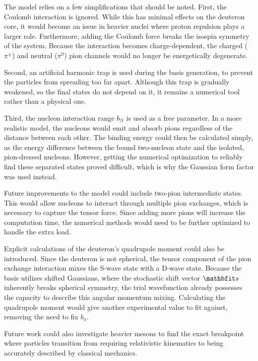 \documentclass[a4paper,oneside,article,12pt]{memoir}
\begin{document}
The model relies on a few simplifications that should be noted. First, the Coulomb interaction is ignored. While this has minimal effects on the deuteron core, it would become an issue in heavier nuclei where proton repulsion plays a larger role. Furthermore, adding the Coulomb force breaks the isospin symmetry of the system. Because the interaction becomes charge-dependent, the charged ($\pi^\pm$) and neutral ($\pi^0$) pion channels would no longer be energetically degenerate. 

\newpage
Second, an artificial harmonic trap is used during the basis generation, to prevent the particles from spreading too far apart. Although this trap is gradually weakened, so the final states do not depend on it, it remains a numerical tool rather than a physical one.

Third, the nucleon interaction range $b_N$ is used as a free parameter. In a more realistic model, the nucleons would emit and absorb pions regardless of the distance between each other. The binding energy could then be calculated simply, as the energy difference between the bound two-nucleon state and the isolated, pion-dressed nucleons. However, getting the numerical optimization to reliably find these separated states proved difficult, which is why the Gaussian form factor was used instead.

Future improvements to the model could include two-pion intermediate states. This would allow nucleons to interact through multiple pion exchanges, which is necessary to capture the tensor force. Since adding more pions will increase the computation time, the numerical methods would need to be further optimized to handle the extra load.

Explicit calculations of the deuteron's quadrupole moment could also be introduced. Since the deuteron is not spherical, the tensor component of the pion exchange interaction mixes the S-wave state with a D-wave state. Because the basis utilizes shifted Gaussians, where the stochastic shift vector $\v{s}$ inherently breaks spherical symmetry, the trial wavefunction already possesses the capacity to describe this angular momentum mixing. Calculating the quadrupole moment would give another experimental value to fit against, removing the need to fix $b_π$. 

Future work could also investigate heavier mesons to find the exact breakpoint where particles transition from requiring relativistic kinematics to being accurately described by classical mechanics.
\end{document}
